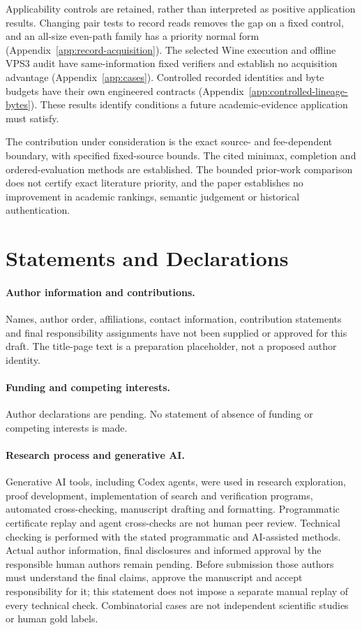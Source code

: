 \documentclass[pdflatex,sn-mathphys-num]{sn-jnl}
\theoremstyle{thmstyleone}
\theoremstyle{thmstylethree}
\theoremstyle{thmstyletwo}
\begin{document}
Applicability controls are retained, rather than interpreted as positive
application results. Changing pair tests to record reads removes the gap
on a fixed control, and an all-size even-path family has a priority normal
form (Appendix~\ref{app:record-acquisition}). The selected Wine execution
and offline VPS3 audit have same-information fixed verifiers and establish
no acquisition advantage (Appendix~\ref{app:cases}). Controlled recorded
identities and byte budgets have their own engineered contracts
(Appendix~\ref{app:controlled-lineage-bytes}). These results identify
conditions a future academic-evidence application must satisfy.

The contribution under consideration is the exact source- and fee-dependent
boundary, with specified fixed-source bounds. The cited minimax,
completion and ordered-evaluation methods are established. The bounded
prior-work comparison does not certify exact literature priority, and
the paper establishes no improvement in academic rankings, semantic
judgement or historical authentication.
\label{page:main-end}

\backmatter
\section*{Statements and Declarations}
\paragraph*{Author information and contributions.}
Names, author order, affiliations, contact information, contribution statements and final responsibility assignments have not been supplied or approved for this draft. The title-page text is a preparation placeholder, not a proposed author identity.
\paragraph*{Funding and competing interests.}
Author declarations are pending. No statement of absence of funding or competing interests is made.
\paragraph*{Research process and generative AI.}
Generative AI tools, including Codex agents, were used in research exploration, proof development, implementation of search and verification programs, automated cross-checking, manuscript drafting and formatting. Programmatic certificate replay and agent cross-checks are not human peer review. Technical checking is performed with the stated programmatic and AI-assisted methods. Actual author information, final disclosures and informed approval by the responsible human authors remain pending. Before submission those authors must understand the final claims, approve the manuscript and accept responsibility for it; this statement does not impose a separate manual replay of every technical check. Combinatorial cases are not independent scientific studies or human gold labels.
\end{document}
